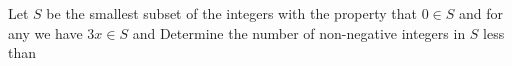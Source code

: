 Let $ S$ be the smallest subset of the integers with the property that $ 0\in S$ and for any  we have $ 3x\in S$ and  Determine the number of non-negative integers in $ S$ less than 